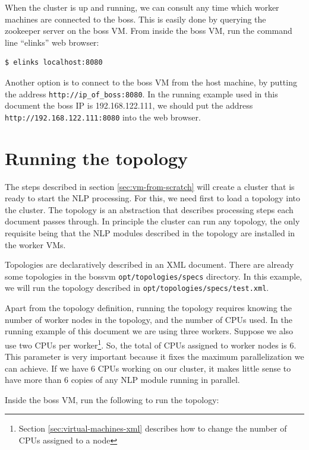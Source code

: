 \documentclass[a4]{article}
\begin{document}
When the cluster is up and running, we can consult any time which worker
machines are connected to the boss. This is easily done by querying the
zookeeper server on the boss VM. From inside the boss VM, run the command
line ``elinks'' web browser:

\begin{verbatim}
$ elinks localhost:8080
\end{verbatim}

Another option is to connect to the boss VM from the host machine, by
putting the address \texttt{http://ip\_of\_boss:8080}. In the running example
used in this document the boss IP is 192.168.122.111, we should put the
address \texttt{http://192.168.122.111:8080} into the web browser.

\section{Running the topology}
\label{sec:running-topology}

The steps described in section \ref{sec:vm-from-scratch} will create a
cluster that is ready to start the NLP processing. For this, we need first
to load a topology into the cluster. The topology is an abstraction that
describes processing steps each document passes through. In principle the
cluster can run any topology, the only requisite being that the NLP modules
described in the topology are installed in the worker VMs.

Topologies are declaratively described in an XML document. There are already
some topologies in the bossvm \texttt{opt/topologies/specs} directory. In
this example, we will run the topology described in
\texttt{opt/topologies/specs/test.xml}. 

Apart from the topology definition, running the topology requires knowing
the number of worker nodes in the topology, and the number of CPUs used. In
the running example of this document we are using three workers. Suppose we
also use two CPUs per worker\footnote{Section \ref{sec:virtual-machines-xml}
  describes how to change the number of CPUs assigned to a node}. So, the
total of CPUs assigned to worker nodes is $6$. This parameter is very
important because it fixes the maximum parallelization we can achieve. If we
have 6 CPUs working on our cluster, it makes little sense to have more than
6 copies of any NLP module running in parallel.

Inside the boss VM, run the following to run the topology:
\end{document}
